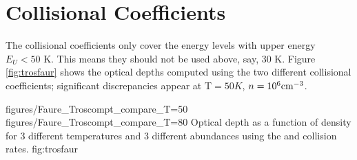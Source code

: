 \section{Collisional Coefficients}
The \citet{Troscompt2009a} collisional coefficients only cover the
\formaldehyde energy levels with upper energy $E_U<50$ K. This means they
should not be used above, say, 30 K.  Figure \ref{fig:trosfaur} shows
the optical depths computed using the two different collisional coefficients;
significant discrepancies appear at T$=50K$, $n=10^6 \textrm{cm}^{-3}$.

               {figures/Faure_Troscompt_compare_T=50}
               {figures/Faure_Troscompt_compare_T=80}
{Optical depth as a function of density for 3 different temperatures and 3 different
abundances using the \citet{Troscompt2009a} and \citet{Faure2013a} collision rates.}
{fig:trosfaur}



